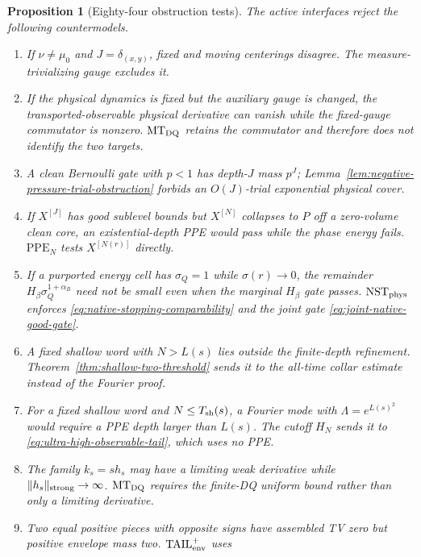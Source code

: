 \documentclass[11pt]{article}
\newtheorem{proposition}[theorem]{Proposition}
\begin{document}
\begin{proposition}[Eighty-four obstruction tests]
\label{prop:v44-obstruction-tests}
The active interfaces reject the following countermodels.
\begin{enumerate}[label=\textup{(T\arabic*)}]
\item If $\nu\ne\mu_0$ and $J=\delta_{(x,y)}$, fixed and moving
      centerings disagree.  The measure-trivializing gauge excludes it.
\item If the physical dynamics is fixed but the auxiliary gauge is changed,
      the transported-observable physical derivative can vanish while the
      fixed-gauge commutator is nonzero.  $\mathrm{MT}_{\rm DQ}$ retains the
      commutator and therefore does not identify the two targets.
\item A clean Bernoulli gate with $p<1$ has depth-$J$ mass $p^J$;
      Lemma~\ref{lem:negative-pressure-trial-obstruction} forbids an
      $O(J)$-trial exponential physical cover.
\item If $X^{[J]}$ has good sublevel bounds but $X^{[N]}$ collapses to $P$
      off a zero-volume clean core, an existential-depth PPE would pass while
      the phase energy fails.  $\mathrm{PPE}_{N}$ tests $X^{[N(r)]}$
      directly.
\item If a purported energy cell has $\sigma_Q=1$ while
      $\sigma(r)\to0$, the remainder
      $H_\beta\sigma_Q^{1+\alpha_B}$ need not be small even when the
      marginal $H_\beta$ gate passes.  $\mathrm{NST}_{\rm phys}$ enforces
      \eqref{eq:native-stopping-comparability} and the joint gate
      \eqref{eq:joint-native-good-gate}.
\item A fixed shallow word with $N>L(s)$ lies outside the finite-depth
      refinement.  Theorem~\ref{thm:shallow-two-threshold} sends it to the
      all-time collar estimate instead of the Fourier proof.
\item For a fixed shallow word and $N\le T_{\rm sh}(s)$, a Fourier mode with
      $\Lambda=e^{L(s)^2}$ would require a PPE depth larger than $L(s)$.
      The cutoff $H_N$ sends it to
      \eqref{eq:ultra-high-observable-tail}, which uses no PPE.
\item The family $k_s=s h_s$ may have a limiting weak derivative while
      $\|h_s\|_{\rm strong}\to\infty$.  $\mathrm{MT}_{\rm DQ}$
      requires the finite-DQ uniform bound rather than only a limiting
      derivative.
\item Two equal positive pieces with opposite signs have assembled TV zero
      but positive envelope mass two.  $\mathrm{TAIL}_{\rm env}^{+}$ uses

\end{enumerate}
\end{proposition}
\end{document}
